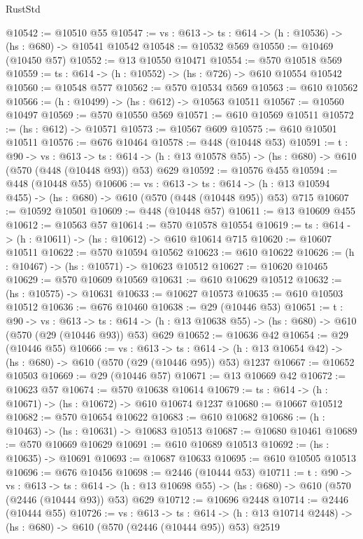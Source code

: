 \begin{lexlean}{RustStd}
\begin{coremodule}
@10542 := @10510 @55
@10547 := {vs : @613} -> {ts : @614} -> (h : @10536) -> (hs : @680) -> @10541 @10542
@10548 := @10532 @569
@10550 := @10469 (@10450 @57)
@10552 := @13 @10550 @10471
@10554 := @570 @10518 @569
@10559 := {ts : @614} -> (h : @10552) -> (hs : @726) -> @610 @10554 @10542
@10560 := @10548 @577
@10562 := @570 @10534 @569
@10563 := @610 @10562
@10566 := (h : @10499) -> (hs : @612) -> @10563 @10511
@10567 := @10560 @10497
@10569 := @570 @10550 @569
@10571 := @610 @10569 @10511
@10572 := (hs : @612) -> @10571
@10573 := @10567 @609
@10575 := @610 @10501 @10511
@10576 := @676 @10464
@10578 := @448 (@10448 @53)
@10591 := {t : @90} ->
  {vs : @613} ->
  {ts : @614} -> (h : @13 @10578 @55) -> (hs : @680) -> @610 (@570 (@448 (@10448 @93)) @53) @629
@10592 := @10576 @455
@10594 := @448 (@10448 @55)
@10606 := {vs : @613} ->
  {ts : @614} -> (h : @13 @10594 @455) -> (hs : @680) -> @610 (@570 (@448 (@10448 @95)) @53) @715
@10607 := @10592 @10501
@10609 := @448 (@10448 @57)
@10611 := @13 @10609 @455
@10612 := @10563 @57
@10614 := @570 @10578 @10554
@10619 := {ts : @614} -> (h : @10611) -> (hs : @10612) -> @610 @10614 @715
@10620 := @10607 @10511
@10622 := @570 @10594 @10562
@10623 := @610 @10622
@10626 := (h : @10467) -> (hs : @10571) -> @10623 @10512
@10627 := @10620 @10465
@10629 := @570 @10609 @10569
@10631 := @610 @10629 @10512
@10632 := (hs : @10575) -> @10631
@10633 := @10627 @10573
@10635 := @610 @10503 @10512
@10636 := @676 @10460
@10638 := @29 (@10446 @53)
@10651 := {t : @90} ->
  {vs : @613} ->
  {ts : @614} -> (h : @13 @10638 @55) -> (hs : @680) -> @610 (@570 (@29 (@10446 @93)) @53) @629
@10652 := @10636 @42
@10654 := @29 (@10446 @55)
@10666 := {vs : @613} ->
  {ts : @614} -> (h : @13 @10654 @42) -> (hs : @680) -> @610 (@570 (@29 (@10446 @95)) @53) @1237
@10667 := @10652 @10503
@10669 := @29 (@10446 @57)
@10671 := @13 @10669 @42
@10672 := @10623 @57
@10674 := @570 @10638 @10614
@10679 := {ts : @614} -> (h : @10671) -> (hs : @10672) -> @610 @10674 @1237
@10680 := @10667 @10512
@10682 := @570 @10654 @10622
@10683 := @610 @10682
@10686 := (h : @10463) -> (hs : @10631) -> @10683 @10513
@10687 := @10680 @10461
@10689 := @570 @10669 @10629
@10691 := @610 @10689 @10513
@10692 := (hs : @10635) -> @10691
@10693 := @10687 @10633
@10695 := @610 @10505 @10513
@10696 := @676 @10456
@10698 := @2446 (@10444 @53)
@10711 := {t : @90} ->
  {vs : @613} ->
  {ts : @614} -> (h : @13 @10698 @55) -> (hs : @680) -> @610 (@570 (@2446 (@10444 @93)) @53) @629
@10712 := @10696 @2448
@10714 := @2446 (@10444 @55)
@10726 := {vs : @613} ->
  {ts : @614} -> (h : @13 @10714 @2448) -> (hs : @680) -> @610 (@570 (@2446 (@10444 @95)) @53) @2519

\end{coremodule}
\end{lexlean}
